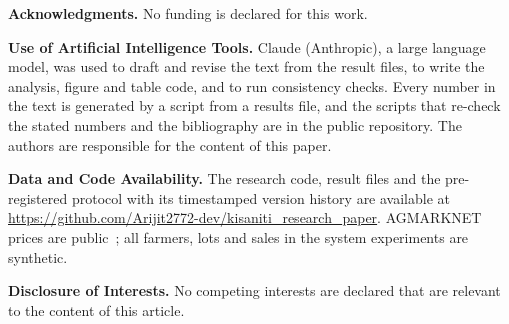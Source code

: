 \par\medskip
\begingroup\small
\noindent\textbf{Acknowledgments.} No funding is declared for this work.

\noindent\textbf{Use of Artificial Intelligence Tools.} Claude (Anthropic), a large language model, was used to draft and revise the text from the result files, to
write the analysis, figure and table code, and to run consistency checks. Every number in the text is generated by a script from a results file, and the
scripts that re-check the stated numbers and the bibliography are in the public repository. The authors are responsible for the content of this paper.

\noindent\textbf{Data and Code Availability.} The research code, result files and the pre-registered protocol with its timestamped
version history are available at \url{https://github.com/Arijit2772-dev/kisaniti_research_paper}. AGMARKNET prices are public~\cite{agmarknet}; all farmers, lots and sales in the system experiments are synthetic.

\noindent\textbf{Disclosure of Interests.} No competing interests are declared that are relevant to the content of this article.
\endgroup
